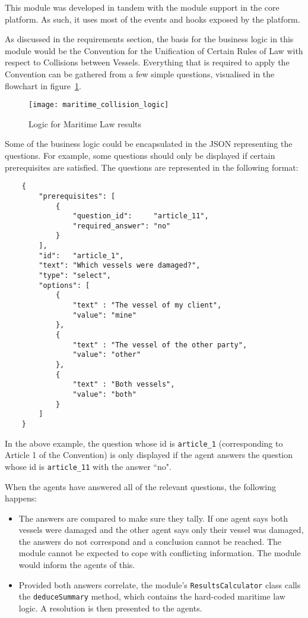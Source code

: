 This module was developed in tandem with the module support in the core platform. As such, it uses most of the events and hooks exposed by the platform.

As discussed in the requirements section, the basis for the business logic in this module would be the Convention for the Unification of Certain Rules of Law with respect to Collisions between Vessels. Everything that is required to apply the Convention can be gathered from a few simple questions, visualised in the flowchart in figure~\ref{uml:maritimeLogic}.

\begin{figure}[h!]
  \centering
    \ifimages
    \texttt{[image: maritime\_collision\_logic]}
    \fi
  \caption{Logic for Maritime Law results}
  \label{uml:maritimeLogic}
\end{figure}

Some of the business logic could be encapsulated in the JSON representing the questions. For example, some questions should only be displayed if certain prerequisites are satisfied. The questions are represented in the following format:

\begin{minipage}{\textwidth}
\begin{lstlisting}
    {
        "prerequisites": [
            {
                "question_id":     "article_11",
                "required_answer": "no"
            }
        ],
        "id":   "article_1",
        "text": "Which vessels were damaged?",
        "type": "select",
        "options": [
            {
                "text" : "The vessel of my client",
                "value": "mine"
            },
            {
                "text" : "The vessel of the other party",
                "value": "other"
            },
            {
                "text" : "Both vessels",
                "value": "both"
            }
        ]
    }
\end{lstlisting}
\end{minipage}

In the above example, the question whose id is \lstinline{article_1} (corresponding to Article 1 of the Convention) is only displayed if the agent answers the question whose id is \lstinline{article_11} with the answer ``no".

When the agents have answered all of the relevant questions, the following happens:

\begin{itemize}
    \item The answers are compared to make sure they tally. If one agent says both vessels were damaged and the other agent says only their vessel was damaged, the answers do not correspond and a conclusion cannot be reached. The module cannot be expected to cope with conflicting information. The module would inform the agents of this.
    \item Provided both answers correlate, the module's \lstinline{ResultsCalculator} class calls the \lstinline{deduceSummary} method, which contains the hard-coded maritime law logic. A resolution is then presented to the agents.
\end{itemize}

